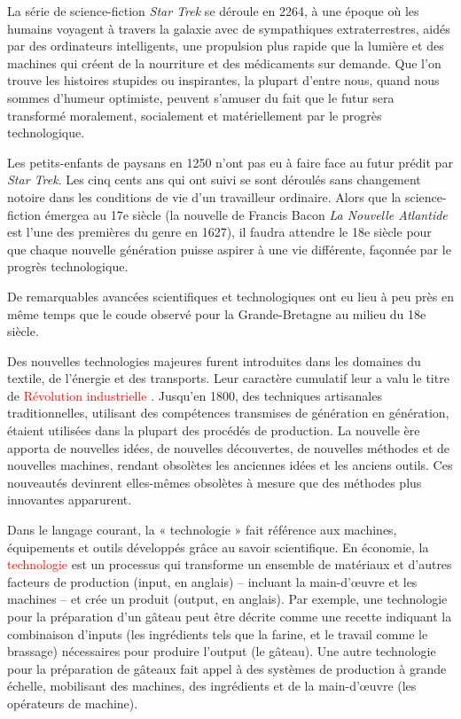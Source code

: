 \documentclass[11pt]{amsart}
\newcommand{\rolered}[1]{ \textcolor{red}{#1} }
\begin{document}
La série de science-fiction \emph{Star Trek} se déroule en 2264, à une époque où les humains voyagent à travers la galaxie avec de sympathiques extraterrestres, aidés par des ordinateurs intelligents, une propulsion plus rapide que la lumière et des machines qui créent de la nourriture et des médicaments sur demande. Que l’on trouve les histoires stupides ou inspirantes, la plupart d’entre nous, quand nous sommes d’humeur optimiste, peuvent s’amuser du fait que le futur sera transformé moralement, socialement et matériellement par le progrès technologique.


Les petits-enfants de paysans en 1250 n’ont pas eu à faire face au futur prédit par \emph{Star Trek}. Les cinq cents ans qui ont suivi se sont déroulés sans changement notoire dans les conditions de vie d’un travailleur ordinaire. Alors que la science-fiction émergea au 17e siècle (la nouvelle de Francis Bacon \emph{La Nouvelle Atlantide} est l’une des premières du genre en 1627), il faudra attendre le 18e siècle pour que chaque nouvelle génération puisse aspirer à une vie différente, façonnée par le progrès technologique.


De remarquables avancées scientifiques et technologiques ont eu lieu à peu près en même temps que le coude observé pour la Grande-Bretagne au milieu du 18e siècle.


Des nouvelles technologies majeures furent introduites dans les domaines du textile, de l’énergie et des transports. Leur caractère cumulatif leur a valu le titre de \rolered{ Révolution industrielle}. Jusqu’en 1800, des tech­niques artisanales traditionnelles, utilisant des compétences transmises de génération en génération, étaient utilisées dans la plupart des procédés de production. La nouvelle ère apporta de nouvelles idées, de nouvelles découvertes, de nouvelles méthodes et de nouvelles machines, rendant obsolètes les anciennes idées et les anciens outils. Ces nouveautés devinrent elles-mêmes obsolètes à mesure que des méthodes plus innovantes apparurent.


Dans le langage courant, la « technologie » fait référence aux machines, équipements et outils développés grâce au savoir scientifique. En économie, la \rolered{ technologie} est un processus qui transforme un ensemble de matériaux et d’autres facteurs de production (input, en anglais) – incluant la main-d’œuvre et les machines – et crée un produit (output, en anglais). Par exemple, une technologie pour la préparation d’un gâteau peut être décrite comme une recette indiquant la combinaison d’inputs (les ingrédients tels que la farine, et le travail comme le brassage) nécessaires pour produire l’output (le gâteau). Une autre technologie pour la préparation de gâteaux fait appel à des systèmes de production à grande échelle, mobilisant des machines, des ingrédients et de la main-d’œuvre (les opérateurs de machine).
\end{document}
